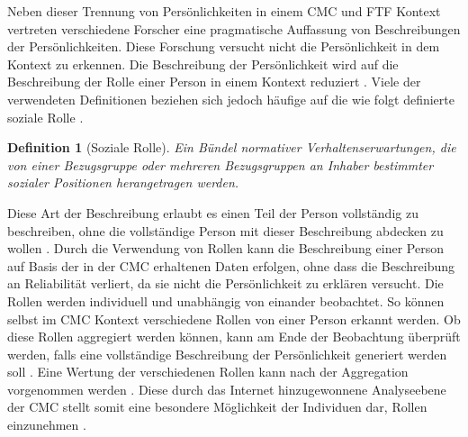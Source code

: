 \documentclass[12pt,a4paper,oneside]{article}
\newtheorem{defi}{Definition}
\begin{document}
\begin{titlepage}
\begin{flushleft}
Neben dieser Trennung von Persönlichkeiten in einem \ac{CMC} und \ac{FTF} Kontext vertreten verschiedene Forscher eine pragmatische Auffassung von Beschreibungen der Persönlichkeiten. Diese Forschung versucht nicht die Persön\-lich\-keit in dem Kontext zu erkennen. Die Beschreibung der Persönlichkeit wird auf die Beschreibung der Rolle einer Person in einem Kontext reduziert \cite{bargh2002can,geller1994rolle}. 
Viele der verwendeten Definitionen beziehen sich jedoch häufige auf die wie folgt definierte soziale Rolle \cite[S. 252]{schaefer1992grund}. 

\begin{defi}[Soziale Rolle]
Ein Bündel normativer Verhaltenserwartungen, die von einer Bezugsgruppe oder mehreren Bezugsgruppen an Inhaber bestimmter sozialer Positionen herangetragen werden. 
\end{defi}

Diese Art der Beschreibung erlaubt es einen Teil der Person vollständig zu beschreiben, ohne die vollständige Person mit dieser Beschreibung abdecken zu wollen \cite{suler1999get}. Durch die Verwendung von Rollen kann die Beschreibung einer Person auf Basis der in der CMC erhaltenen Daten erfolgen, ohne dass die Beschreibung an Reliabilität verliert, da sie nicht die Persönlichkeit zu erklären versucht. Die Rollen werden individuell und unabhängig von einander beobachtet. So können selbst im \ac{CMC} Kontext verschiedene Rollen von einer Person erkannt werden. Ob diese Rollen aggregiert werden können, kann am Ende der Beobachtung überprüft werden, falls eine vollständige Beschreibung der Persönlichkeit generiert werden soll \cite{suler2004online}. Eine Wertung der verschiedenen Rollen kann nach der Aggregation vorgenommen werden \cite{rogers1951client,higgins1987self}. Diese durch das Internet hinzugewonnene Analyseebene der CMC stellt somit eine besondere Möglichkeit der Individuen dar, Rollen einzunehmen \cite{turkle2011life}.


\end{flushleft}
\end{titlepage}
\end{document}
